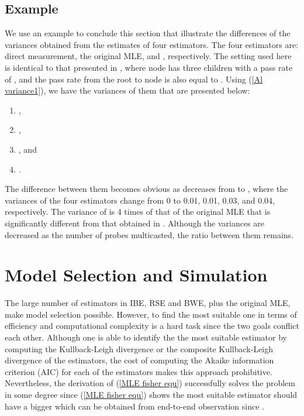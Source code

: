 \documentclass[10pt,onecolumn]{IEEEtran}
\begin{document}
\subsection{Example}
We use an example to conclude this section that illustrate the differences of the variances obtained from the estimates of four estimators. The four estimators are: direct measurement, the original MLE,  and , respectively. The setting used here is identical to that presented in \cite{DHPT06}, where node  has three children with a pass
rate of , and the pass rate from the root to node  is also equal to .  Using (\ref{Al variance1}), we have the variances of them that are presented below:
\begin{enumerate}
\item ,
\item ,
\item , and
\item .
\end{enumerate}
The difference between them becomes obvious as  decreases from  to  , where the variances of the four estimators change from 0 to 0.01, 0.01, 0.03, and 0.04, respectively. The variance of  is 4 times of that of the original MLE that is significantly different from that obtained in \cite{DHPT06}. Although the variances are decreased as the number of probes multicasted, the ratio between them remains.

\section{Model Selection and Simulation} \label{section 6}
The large number of estimators in IBE, RSE and BWE, plus the original MLE, make model selection possible. However, to find the most suitable one in terms of efficiency and computational complexity is a hard task since the two goals conflict each other. Although one is able to identify the the most suitable estimator by computing the Kullback-Leigh divergence or the composite Kullback-Leigh divergence of the estimators, the cost of computing the Akaike information criterion (AIC) for each of the estimators makes this approach prohibitive.  Nevertheless, the derivation of (\ref{MLE fisher equ}) successfully solves the problem in some degree since (\ref{MLE fisher equ}) shows the most suitable estimator should have a bigger  which can be obtained from end-to-end observation since .
\end{document}

